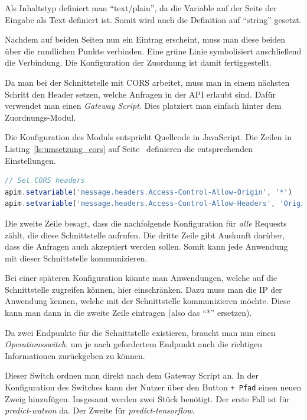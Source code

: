 Als Inhaltstyp definiert man \enquote{text/plain}, da die Variable auf der Seite der Eingabe als Text definiert ist.
Somit wird auch die Definition auf \enquote{string} gesetzt.

Nachdem auf beiden Seiten nun ein Eintrag erscheint, muss man diese beiden über die rundlichen Punkte verbinden. Eine
grüne Linie symbolisiert anschließend die Verbindung. Die Konfiguration der Zuordnung ist damit fertiggestellt.

Da man bei der Schnittstelle mit CORS arbeitet, muss man in einem nächsten Schritt den Header setzen, welche Anfragen
in der API erlaubt sind. Dafür verwendet man einen \textit{Gateway Script}. Dies platziert man einfach hinter dem
Zuordnungs-Modul.

Die Konfiguration des Moduls entspricht Quellcode in JavaScript. Die Zeilen in Listing~\ref{ls:umsetzung_cors} auf
Seite~\pageref{ls:umsetzung_cors} definieren die entsprechenden Einstellungen.

\begin{lstlisting}[language=JavaScript, caption=Gateway Script für CORS, label=ls:umsetzung_cors]
// Set CORS headers
apim.setvariable('message.headers.Access-Control-Allow-Origin', '*')
apim.setvariable('message.headers.Access-Control-Allow-Headers', 'Origin, X-Requested-With, Content-Type, Accept')
\end{lstlisting}

Die zweite Zeile besagt, dass die nachfolgende Konfiguration für \textit{alle} Requests zählt, die diese Schnittstelle
aufrufen. Die dritte Zeile gibt Auskunft darüber, dass die Anfragen auch akzeptiert werden sollen. Somit kann jede
Anwendung mit dieser Schnittstelle kommunizieren.

Bei einer späteren Konfiguration könnte man Anwendungen, welche auf die Schnittstelle zugreifen können, hier
einschränken. Dazu muss man die IP der Anwendung kennen, welche mit der Schnittstelle kommunizieren möchte. Diese kann
man dann in die zweite Zeile eintragen (also das \enquote{*} ersetzen).

Da zwei Endpunkte für die Schnittstelle existieren, braucht man nun einen \textit{Operationsswitch}, um je nach
gefordertem Endpunkt auch die richtigen Informationen zurückgeben zu können.

Dieser Switch ordnen man direkt nach dem Gateway Script an. In der Konfiguration des Switches kann der Nutzer über den
Button \texttt{+ Pfad} einen neuen Zweig hinzufügen. Insgesamt werden zwei Stück benötigt. Der erste Fall ist für
\textit{predict-watson} da. Der Zweite für \textit{predict-tensorflow}.


